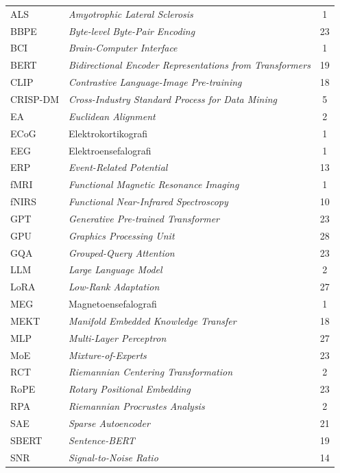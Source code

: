 \begin{longtable}{@{} l >{\raggedright\arraybackslash}p{7.5cm} c @{}}
ALS & \textit{Amyotrophic Lateral Sclerosis} & 1 \\
BBPE & \textit{Byte-level Byte-Pair Encoding} & 23 \\
BCI & \textit{Brain-Computer Interface} & 1 \\
BERT & \textit{Bidirectional Encoder Representations from Transformers} & 19 \\
CLIP & \textit{Contrastive Language-Image Pre-training} & 18 \\
CRISP-DM & \textit{Cross-Industry Standard Process for Data Mining} & 5 \\
EA & \textit{Euclidean Alignment} & 2 \\
ECoG & Elektrokortikografi & 1 \\
EEG & Elektroensefalografi & 1 \\
ERP & \textit{Event-Related Potential} & 13 \\
fMRI & \textit{Functional Magnetic Resonance Imaging} & 1 \\
fNIRS & \textit{Functional Near-Infrared Spectroscopy} & 10 \\
GPT & \textit{Generative Pre-trained Transformer} & 23 \\
GPU & \textit{Graphics Processing Unit} & 28 \\
GQA & \textit{Grouped-Query Attention} & 23 \\
LLM & \textit{Large Language Model} & 2 \\
LoRA & \textit{Low-Rank Adaptation} & 27 \\
MEG & Magnetoensefalografi & 1 \\
MEKT & \textit{Manifold Embedded Knowledge Transfer} & 18 \\
MLP & \textit{Multi-Layer Perceptron} & 27 \\
MoE & \textit{Mixture-of-Experts} & 23 \\
RCT & \textit{Riemannian Centering Transformation} & 2 \\
RoPE & \textit{Rotary Positional Embedding} & 23 \\
RPA & \textit{Riemannian Procrustes Analysis} & 2 \\
SAE & \textit{Sparse Autoencoder} & 21 \\
SBERT & \textit{Sentence-BERT} & 19 \\
SNR & \textit{Signal-to-Noise Ratio} & 14 \\


\end{longtable}

